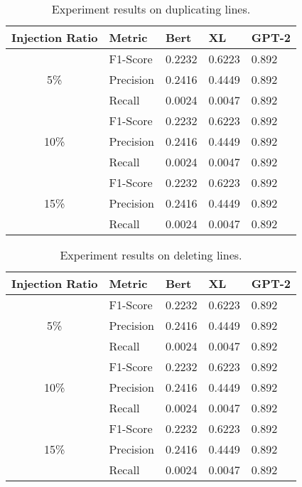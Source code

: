 \begin{appendix}
\begin{table}
\centering
\begin{tabular}{ c l l l l }
\toprule
Injection Ratio & Metric & Bert & XL & GPT-2\\
\midrule
     & F1-Score & 0.2232 & 0.6223 & 0.892\\
5\%  & Precision & 0.2416 & 0.4449 & 0.892\\
     & Recall & 0.0024 & 0.0047 & 0.892\\ 
\midrule
     & F1-Score & 0.2232 & 0.6223 & 0.892\\
10\% & Precision & 0.2416 & 0.4449 & 0.892\\
     & Recall & 0.0024 & 0.0047 & 0.892\\ 
\midrule
     & F1-Score & 0.2232 & 0.6223 & 0.892\\
15\% & Precision & 0.2416 & 0.4449 & 0.892\\
     & Recall & 0.0024 & 0.0047 & 0.892\\ 
\bottomrule
\end{tabular}
\caption{Experiment results on duplicating lines.}
\end{table}


\begin{table}
\centering
\begin{tabular}{ c l l l l }
\toprule
Injection Ratio & Metric & Bert & XL & GPT-2\\
\midrule
     & F1-Score & 0.2232 & 0.6223 & 0.892\\
5\%  & Precision & 0.2416 & 0.4449 & 0.892\\
     & Recall & 0.0024 & 0.0047 & 0.892\\ 
\midrule
     & F1-Score & 0.2232 & 0.6223 & 0.892\\
10\% & Precision & 0.2416 & 0.4449 & 0.892\\
     & Recall & 0.0024 & 0.0047 & 0.892\\ 
\midrule
     & F1-Score & 0.2232 & 0.6223 & 0.892\\
15\% & Precision & 0.2416 & 0.4449 & 0.892\\
     & Recall & 0.0024 & 0.0047 & 0.892\\ 
\bottomrule
\end{tabular}
\caption{Experiment results on deleting lines.}
\end{table}


\end{appendix}

\endinput
